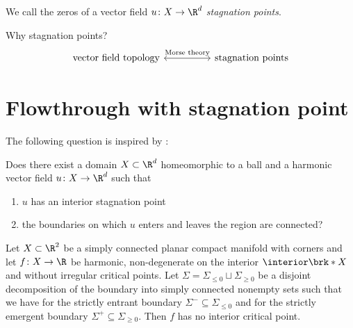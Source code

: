 \begin{frame}[fragile]
  \begin{definition}
    We call the zeros of a vector field $u\colon X\to\R^d$ \emph{stagnation points}.
  \end{definition}
  \begin{block}{Why stagnation points?}
    \tikzset{external/export=false}
    \[\begin{tikzcd}[column sep=huge]
      \text{vector field topology} \arrow[r,leftrightarrow,"\text{Morse theory}"] &\text{stagnation points}
    \end{tikzcd}\]
  \end{block}
  
\end{frame}

\section{Flowthrough with stagnation point}

\begin{frame}
  The following question is inspired by \cite{Alber1992}:
  \begin{question} \label{qu:flowthroughStagnationPoint}
    Does there exist a domain $X\subset\R^d$ homeomorphic to a ball and a harmonic vector field $u\colon X\to\R^d$ such that
    \begin{enumerate}
      \item $u$ has an interior stagnation point
      \item the boundaries on which $u$ enters and leaves the region are connected?
    \end{enumerate}
  \end{question}
\end{frame}

\begin{frame}
  \begin{proposition}[Negative answer to this question in $d=2$ dimensions]\label{pr:n2_negativeResult}
    Let $X\subset\R^2$ be a simply connected planar compact manifold with corners and let $f\colon X\to\R$ be harmonic, non-degenerate on the interior
    $\interior\brk*{X}$ and without irregular critical points.
    Let $\Sigma=\Sigma_{\leq0}\sqcup\Sigma_{\geq0}$ be a disjoint decomposition of the boundary into simply connected nonempty sets such that
    we have for the strictly entrant boundary $\Sigma^-\subseteq\Sigma_{\leq0}$ and for the strictly emergent boundary $\Sigma^+\subseteq\Sigma_{\geq0}$.
    Then $f$ has no interior critical point.
  \end{proposition}
\end{frame}

